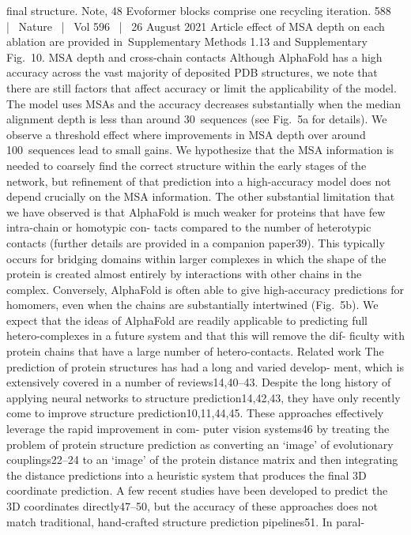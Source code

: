 final structure. Note, 48 Evoformer blocks comprise one recycling iteration.
588  |  Nature  |  Vol 596  |  26 August 2021
Article
effect of MSA depth on each ablation are provided in Supplementary
Methods 1.13 and Supplementary Fig. 10.
MSA depth and cross-chain contacts
Although AlphaFold has a high accuracy across the vast majority of
deposited PDB structures, we note that there are still factors that affect
accuracy or limit the applicability of the model. The model uses MSAs
and the accuracy decreases substantially when the median alignment
depth is less than around 30 sequences (see Fig. 5a for details). We
observe a threshold effect where improvements in MSA depth over
around 100 sequences lead to small gains. We hypothesize that the MSA
information is needed to coarsely find the correct structure within the
early stages of the network, but refinement of that prediction into a
high-accuracy model does not depend crucially on the MSA information.
The other substantial limitation that we have observed is that AlphaFold
is much weaker for proteins that have few intra-chain or homotypic con-
tacts compared to the number of heterotypic contacts (further details
are provided in a companion paper39). This typically occurs for bridging
domains within larger complexes in which the shape of the protein is
created almost entirely by interactions with other chains in the complex.
Conversely, AlphaFold is often able to give high-accuracy predictions for
homomers, even when the chains are substantially intertwined (Fig. 5b).
We expect that the ideas of AlphaFold are readily applicable to predicting
full hetero-complexes in a future system and that this will remove the dif-
ficulty with protein chains that have a large number of hetero-contacts.
Related work
The prediction of protein structures has had a long and varied develop-
ment, which is extensively covered in a number of reviews14,40–43. Despite
the long history of applying neural networks to structure prediction14,42,43,
they have only recently come to improve structure prediction10,11,44,45.
These approaches effectively leverage the rapid improvement in com-
puter vision systems46 by treating the problem of protein structure
prediction as converting an ‘image’ of evolutionary couplings22–24 to an
‘image’ of the protein distance matrix and then integrating the distance
predictions into a heuristic system that produces the final 3D coordinate
prediction. A few recent studies have been developed to predict the 3D
coordinates directly47–50, but the accuracy of these approaches does not
match traditional, hand-crafted structure prediction pipelines51. In paral-
